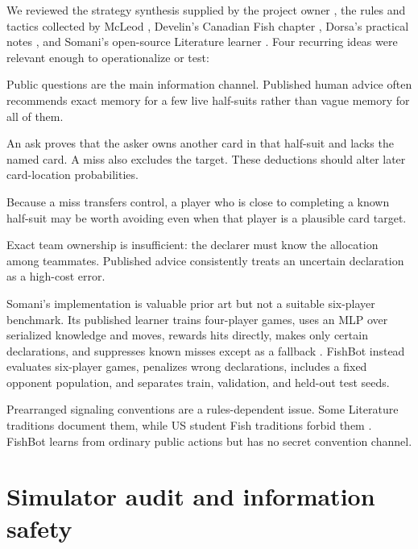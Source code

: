 \documentclass[11pt]{article}
\begin{document}
We reviewed the strategy synthesis supplied by the project owner \cite{strategy-site}, the rules and tactics collected by McLeod \cite{pagat}, Develin's Canadian Fish chapter \cite{develin}, Dorsa's practical notes \cite{dorsa}, and Somani's open-source Literature learner \cite{somani}. Four recurring ideas were relevant enough to operationalize or test:

\begin{description}[style=nextline]
  \item[Perfect or triaged memory.] Public questions are the main information channel. Published human advice often recommends exact memory for a few live half-suits rather than vague memory for all of them.
  \item[Ask the asker and continue a teammate's miss.] An ask proves that the asker owns another card in that half-suit and lacks the named card. A miss also excludes the target. These deductions should alter later card-location probabilities.
  \item[Lock out dangerous opponents.] Because a miss transfers control, a player who is close to completing a known half-suit may be worth avoiding even when that player is a plausible card target.
  \item[Claim conservatively.] Exact team ownership is insufficient: the declarer must know the allocation among teammates. Published advice consistently treats an uncertain declaration as a high-cost error.
\end{description}

Somani's implementation is valuable prior art but not a suitable six-player benchmark. Its published learner trains four-player games, uses an MLP over serialized knowledge and moves, rewards hits directly, makes only certain declarations, and suppresses known misses except as a fallback \cite{somani}. FishBot instead evaluates six-player games, penalizes wrong declarations, includes a fixed opponent population, and separates train, validation, and held-out test seeds.

Prearranged signaling conventions are a rules-dependent issue. Some Literature traditions document them, while US student Fish traditions forbid them \cite{pagat,develin,strategy-site}. FishBot learns from ordinary public actions but has no secret convention channel.

\section{Simulator audit and information safety}
\end{document}
